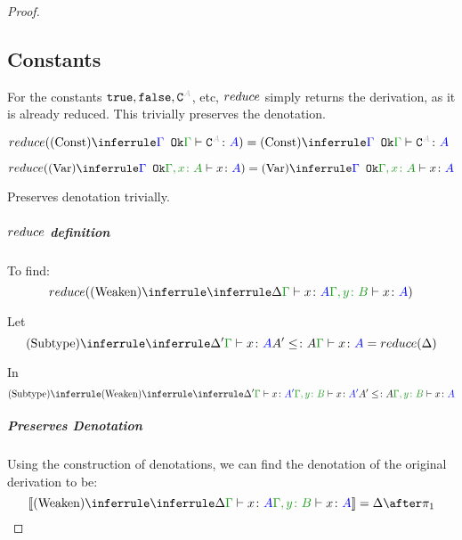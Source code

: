 \documentclass{report}
\begin{document}
\begin{framed}
\begin{proof}
    
        
            \subsection{Constants}
                For the constants $\t, \f, \const{A}$, etc, $reduce$ simply returns the derivation, as it is already reduced. This trivially preserves the denotation.
        
                $\reduce(\truleconst) = \truleconst$
        
                \begin{equation}
                    \reduce(\ntreeruleI{Var}{\ok{\G}}{\typerelation{\gax}{x}{A}}) =  \ntreeruleI{Var}{\ok{\G}}{\typerelation{\gax}{x}{A}}
                \end{equation}
        
                Preserves denotation trivially.
        
                \subparagraph{$reduce$ definition}
                To find:
                \begin{equation}
                    \reduce(\ntreeruleI{Weaken}{\treeruleI{\D}{\gtyperelation{x}{A}}}{\typerelation{\gby}{x}{A}})
                \end{equation}
        
                Let 
                \begin{equation}\label{WeakenDeltaReduction}
                    \ntreeruleII{Subtype}{\treeruleI{\D'}{\gtyperelation{x}{A}}}{ A'\subtype A}{\gtyperelation{x}{A}} = \reduce(\D)
                \end{equation}
        
                In 
                \begin{equation}
                    \ntreeruleII{Subtype}{
                    \ntreeruleI{Weaken}{
                        \treeruleI{\D'}{\gtyperelation{x}{A'}}
                    } {
                        \typerelation{\gby}{x}{A'}
                    }
                    }{
                    A' \subtype A
                    }{\typerelation{\gby}{x}{A}}
                \end{equation}
        
                \subparagraph{Preserves Denotation}
                Using the construction of denotations, we can find the denotation of the original derivation to be:
                \begin{equation}
                    \deno{\ntreeruleI{Weaken}{\treeruleI{\D}{\gtyperelation{x}{A}}}{\typerelation{\gby}{x}{A}}} = \D \after \p
                \end{equation}
        

\end{proof}
\end{framed}
\end{document}
